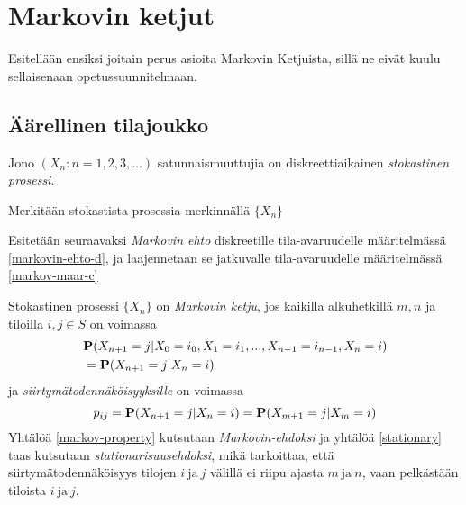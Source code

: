 
\section{Markovin ketjut}

Esitellään ensiksi joitain perus asioita Markovin Ketjuista, sillä ne eivät kuulu sellaisenaan opetussuunnitelmaan. \cite{piiroinen_stokastiset_nodate}

\subsection{Äärellinen tilajoukko}

\begin{maar}
	Jono $(X_n:n=1,2,3,...)$ satunnaismuuttujia on diskreettiaikainen \textit{stokastinen prosessi}.
\end{maar}

\begin{merk}
	Merkitään stokastista prosessia merkinnällä $\{ X_n \}$
\end{merk}

Esitetään seuraavaksi \textit{Markovin ehto} diskreetille tila-avaruudelle määritelmässä \ref{markovin-ehto-d}, ja laajennetaan se jatkuvalle tila-avaruudelle määritelmässä \ref{markov-maar-c}

\begin{maar}\label{markovin-ehto-d}
	Stokastinen prosessi $\{X_n\}$ on \textit{Markovin ketju}, jos kaikilla alkuhetkillä $m,n$ ja tiloilla $i,j\in S$ on voimassa
	\begin{equation}\label{markov-property}
		\begin{split}
			&\textbf{P}(X_{n+1}=j|X_0=i_0,X_1=i_1,...,X_{n-1}=i_{n-1},X_n=i) \\
		 &= \textbf{P}(X_{n+1}=j|X_n=i) 
		\end{split}
	\end{equation}
	ja \textit{siirtymätodennäköisyyksille} on voimassa 
	\begin{equation}\label{stationary}
		p_{ij}=\textbf{P}(X_{n+1}=j|X_n=i)=\textbf{P}(X_{m+1}=j|X_m=i)
	\end{equation}
	Yhtälöä \ref{markov-property} kutsutaan \textit{Markovin-ehdoksi} ja yhtälöä \ref{stationary} taas kutsutaan \textit{stationarisuusehdoksi}, mikä tarkoittaa, 
	että siirtymätodennäköisyys tilojen $i\ \text{ja}\ j$ välillä ei riipu ajasta $m\ \text{ja}\ n$, vaan pelkästään tiloista $i\ \text{ja}\ j$.
\end{maar}

